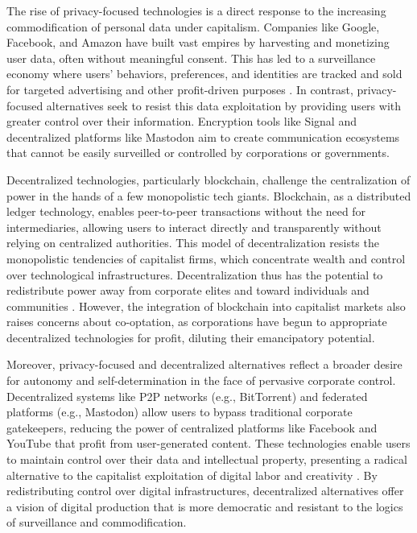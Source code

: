 \begin{refsection}
The rise of privacy-focused technologies is a direct response to the increasing commodification of personal data under capitalism. Companies like Google, Facebook, and Amazon have built vast empires by harvesting and monetizing user data, often without meaningful consent. This has led to a surveillance economy where users' behaviors, preferences, and identities are tracked and sold for targeted advertising and other profit-driven purposes \cite[pp.~151-153]{zuboff2019}. In contrast, privacy-focused alternatives seek to resist this data exploitation by providing users with greater control over their information. Encryption tools like Signal and decentralized platforms like Mastodon aim to create communication ecosystems that cannot be easily surveilled or controlled by corporations or governments.

Decentralized technologies, particularly blockchain, challenge the centralization of power in the hands of a few monopolistic tech giants. Blockchain, as a distributed ledger technology, enables peer-to-peer transactions without the need for intermediaries, allowing users to interact directly and transparently without relying on centralized authorities. This model of decentralization resists the monopolistic tendencies of capitalist firms, which concentrate wealth and control over technological infrastructures. Decentralization thus has the potential to redistribute power away from corporate elites and toward individuals and communities \cite[pp.~67-69]{tapscott2016}. However, the integration of blockchain into capitalist markets also raises concerns about co-optation, as corporations have begun to appropriate decentralized technologies for profit, diluting their emancipatory potential.

Moreover, privacy-focused and decentralized alternatives reflect a broader desire for autonomy and self-determination in the face of pervasive corporate control. Decentralized systems like P2P networks (e.g., BitTorrent) and federated platforms (e.g., Mastodon) allow users to bypass traditional corporate gatekeepers, reducing the power of centralized platforms like Facebook and YouTube that profit from user-generated content. These technologies enable users to maintain control over their data and intellectual property, presenting a radical alternative to the capitalist exploitation of digital labor and creativity \cite[pp.~203-205]{hardt2000}. By redistributing control over digital infrastructures, decentralized alternatives offer a vision of digital production that is more democratic and resistant to the logics of surveillance and commodification.


\end{refsection}
